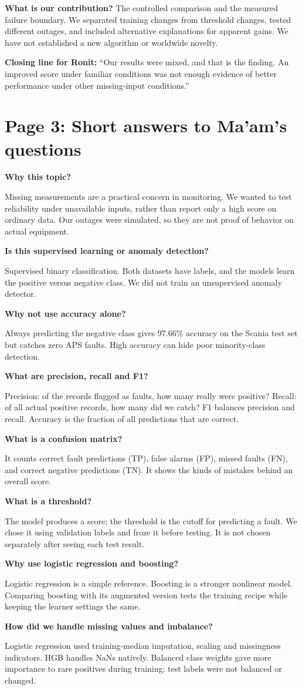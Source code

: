 \documentclass[11pt,a4paper]{article}
\newcommand{\qa}[2]{\textbf{#1}\par #2\par}
\begin{document}
\textbf{What is our contribution?} The controlled comparison and the measured failure boundary. We separated training changes from threshold changes, tested different outages, and included alternative explanations for apparent gains. We have not established a new algorithm or worldwide novelty.

\textbf{Closing line for Ronit:} ``Our results were mixed, and that is the finding. An improved score under familiar conditions was not enough evidence of better performance under other missing-input conditions.''

\newpage
\section*{Page 3: Short answers to Ma'am's questions}
\small
\setlength{\parskip}{3pt}
\qa{Why this topic?}{Missing measurements are a practical concern in monitoring. We wanted to test reliability under unavailable inputs, rather than report only a high score on ordinary data. Our outages were simulated, so they are not proof of behavior on actual equipment.}
\qa{Is this supervised learning or anomaly detection?}{Supervised binary classification. Both datasets have labels, and the models learn the positive versus negative class. We did not train an unsupervised anomaly detector.}
\qa{Why not use accuracy alone?}{Always predicting the negative class gives 97.66\% accuracy on the Scania test set but catches zero APS faults. High accuracy can hide poor minority-class detection.}
\qa{What are precision, recall and F1?}{Precision: of the records flagged as faults, how many really were positive? Recall: of all actual positive records, how many did we catch? F1 balances precision and recall. Accuracy is the fraction of all predictions that are correct.}
\qa{What is a confusion matrix?}{It counts correct fault predictions (TP), false alarms (FP), missed faults (FN), and correct negative predictions (TN). It shows the kinds of mistakes behind an overall score.}
\qa{What is a threshold?}{The model produces a score; the threshold is the cutoff for predicting a fault. We chose it using validation labels and froze it before testing. It is not chosen separately after seeing each test result.}
\qa{Why use logistic regression and boosting?}{Logistic regression is a simple reference. Boosting is a stronger nonlinear model. Comparing boosting with its augmented version tests the training recipe while keeping the learner settings the same.}
\qa{How did we handle missing values and imbalance?}{Logistic regression used training-median imputation, scaling and missingness indicators. HGB handles NaNs natively. Balanced class weights gave more importance to rare positives during training; test labels were not balanced or changed.}
\end{document}
